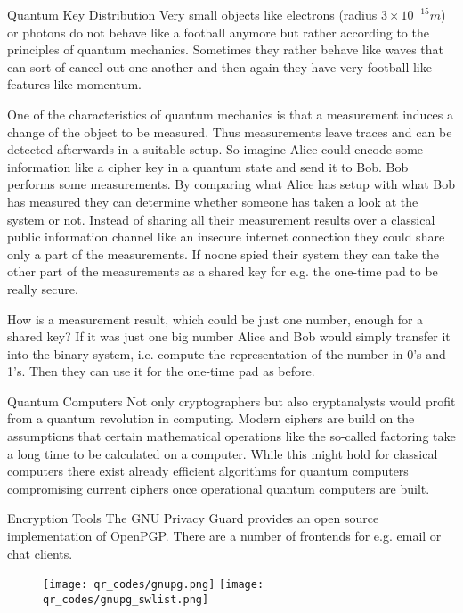 \documentclass[final,hyperref={pdfpagelabels=false}]{beamer}
\begin{document}
\begin{frame}{}
\begin{columns}[t]
\begin{column}{.32\linewidth}
        \begin{block}{Quantum Key Distribution}
          Very small objects like electrons (radius $3\times 10^{-15}m$) or photons do not behave like a football anymore but rather according to the principles of quantum mechanics. Sometimes they rather behave like waves that can sort of cancel out one another and then again they have very football-like features like momentum. \par 
          One of the characteristics of quantum mechanics is that a measurement induces a change of the object to be measured. Thus measurements leave traces and can be detected afterwards in a suitable setup. So imagine Alice could encode some information like a cipher key in a quantum state and send it to Bob. Bob performs some measurements. By comparing what Alice has setup with what Bob has measured they can determine whether someone has taken a look at the system or not. Instead of sharing all their measurement results over a classical public information channel like an insecure internet connection they could share only a part of the measurements. If noone spied their system they can take the other part of the measurements as a shared key for e.g. the one-time pad to be really secure. \par
          How is a measurement result, which could be just one number, enough for a shared key? If it was just one big number Alice and Bob would simply transfer it into the binary system, i.e. compute the representation of the number in 0's and 1's. Then they can use it for the one-time pad as before.
        \end{block}

        \begin{block}{Quantum Computers}
          Not only cryptographers but also cryptanalysts would profit from a quantum revolution in computing. Modern ciphers are build on the assumptions that certain mathematical operations like the so-called factoring take a long time to be calculated on a computer. While this might hold for classical computers there exist already efficient algorithms for quantum computers compromising current ciphers once operational quantum computers are built. 
        \end{block}
        \begin{block}{Encryption Tools}
        The GNU Privacy Guard provides an open source implementation of OpenPGP. There are a number of frontends for e.g. email or chat clients.
        \begin{figure}
          \center
            \texttt{[image: qr\_codes/gnupg.png]} \hspace{20pt}
            \texttt{[image: qr\_codes/gnupg\_swlist.png]}
        \end{figure}
        \end{block}
      \end{column}
    \end{columns}
  \end{frame}
\end{document}
